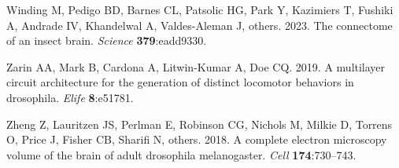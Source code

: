 \documentclass[
  11pt,
]{article}
\newlength{\cslhangindent}
\newenvironment{CSLReferences}[2] %
 {\begin{list}{}{%
  \setlength{\itemindent}{0pt}
  \setlength{\leftmargin}{0pt}
  \setlength{\parsep}{0pt}
  \ifodd #1
   \setlength{\leftmargin}{\cslhangindent}
   \setlength{\itemindent}{-1\cslhangindent}
  \fi
  \setlength{\itemsep}{#2\baselineskip}}}
 {\end{list}}
\begin{document}
\begin{CSLReferences}{1}{0}
Winding M, Pedigo BD, Barnes CL, Patsolic HG, Park Y, Kazimiers T,
Fushiki A, Andrade IV, Khandelwal A, Valdes-Aleman J, others. 2023. The
connectome of an insect brain. \emph{Science} \textbf{379}:eadd9330.

Zarin AA, Mark B, Cardona A, Litwin-Kumar A, Doe CQ. 2019. A multilayer
circuit architecture for the generation of distinct locomotor behaviors
in drosophila. \emph{Elife} \textbf{8}:e51781.

Zheng Z, Lauritzen JS, Perlman E, Robinson CG, Nichols M, Milkie D,
Torrens O, Price J, Fisher CB, Sharifi N, others. 2018. A complete
electron microscopy volume of the brain of adult drosophila
melanogaster. \emph{Cell} \textbf{174}:730--743.

\end{CSLReferences}
\end{document}
